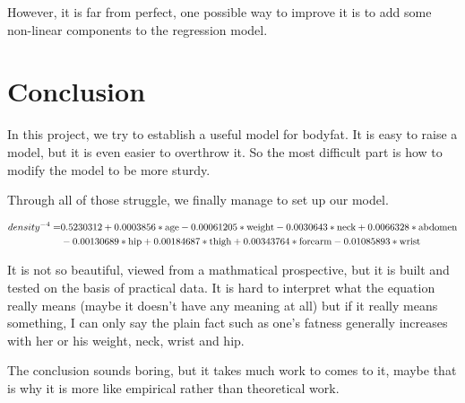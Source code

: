 \documentclass[11pt]{article}
\begin{document}
However, it is far from perfect, one possible way to improve it is to add some non-linear components to the regression model.

\section{Conclusion}

\noindent


In this project, we try to establish a useful model for bodyfat. It is easy to raise a model, but it is even easier to overthrow it. So the most difficult part is how to modify the model to be more sturdy.

Through all of those struggle, we finally manage to set up our model. 

\begin{align}
density^{-4} = &0.5230312+ 0.0003856*\text{age}- 0.00061205*\text{weight}-0.0030643*\text{neck}+0.0066328*\text{abdomen}\notag\\&-0.00130689*\text{hip}+0.00184687*\text{thigh}+0.00343764*\text{forearm}-0.01085893*\text{wrist}\notag
\end{align}

It is not so beautiful, viewed from a mathmatical prospective, but it is built and tested on the basis of practical data. It is hard to interpret what the equation really means (maybe it doesn't have any meaning at all) but if it really means something, I can only say the plain fact such as one's fatness generally increases with her or his weight, neck, wrist and hip.


The conclusion sounds boring, but it takes much work to comes to it, maybe that is why it is more like empirical rather than theoretical work.
\end{document}
